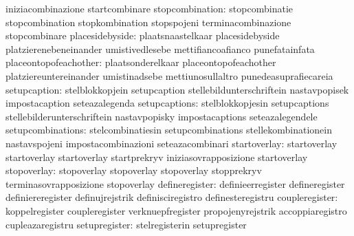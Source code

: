                                   iniziacombinazione               startcombinare
                 stopcombination: stopcombinatie                   stopcombination
                                  stopkombination                  stopspojeni
                                  terminacombinazione              stopcombinare
                 placesidebyside: plaatsnaastelkaar                placesidebyside
                                  platzierenebeneinander           umistivedlesebe
                                  mettifiancoafianco               punefatainfata
           placeontopofeachother: plaatsonderelkaar                placeontopofeachother
                                  platziereuntereinander           umistinadsebe
                                  mettiunosullaltro                punedeasuprafiecareia
                    setupcaption: stelblokkopjein                  setupcaption
                                  stellebildunterschriftein        nastavpopisek
                                  impostacaption                   seteazalegenda %
                   setupcaptions: stelblokkopjesin                 setupcaptions
                                  stellebilderunterschriftein      nastavpopisky
                                  impostacaptions                  seteazalegendele %
               setupcombinations: stelcombinatiesin                setupcombinations
                                  stellekombinationein             nastavspojeni
                                  impostacombinazioni              seteazacombinari
                    startoverlay: startoverlay                     startoverlay
                                  startoverlay                     startprekryv
                                  iniziasovrapposizione            startoverlay
                     stopoverlay: stopoverlay                      stopoverlay
                                  stopoverlay                      stopprekryv
                                  terminasovrapposizione           stopoverlay
                  defineregister: definieerregister                defineregister
                                  definiereregister                definujrejstrik
                                  definisciregistro                definesteregistru
                  coupleregister: koppelregister                   coupleregister
                                  verknuepfregister                propojenyrejstrik
                                  accoppiaregistro                 cupleazaregistru
                   setupregister: stelregisterin                   setupregister
